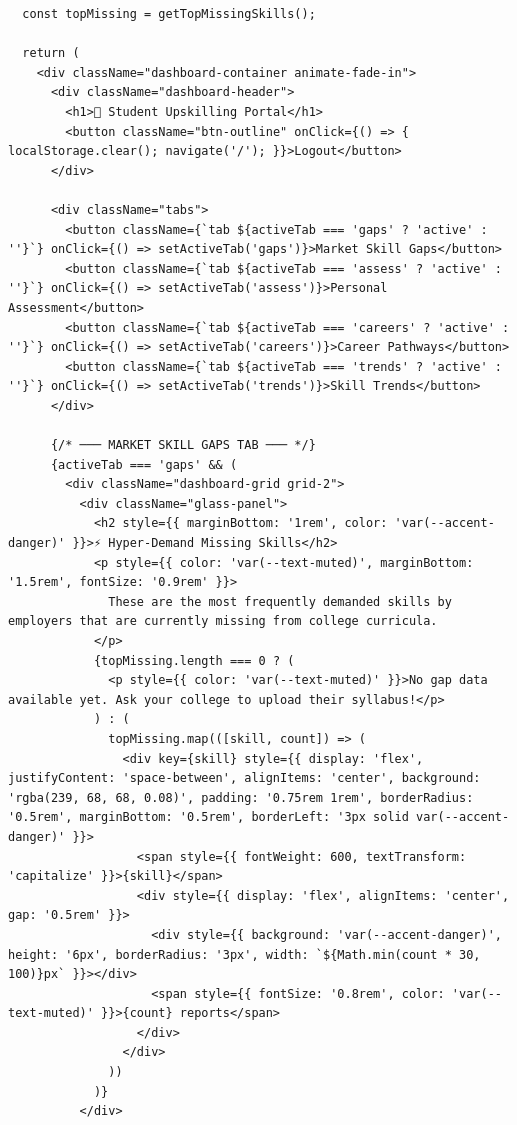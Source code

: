 \documentclass[12pt,a4paper]{report}
\begin{document}
\begin{verbatim}
  const topMissing = getTopMissingSkills();

  return (
    <div className="dashboard-container animate-fade-in">
      <div className="dashboard-header">
        <h1>🔮 Student Upskilling Portal</h1>
        <button className="btn-outline" onClick={() => { localStorage.clear(); navigate('/'); }}>Logout</button>
      </div>

      <div className="tabs">
        <button className={`tab ${activeTab === 'gaps' ? 'active' : ''}`} onClick={() => setActiveTab('gaps')}>Market Skill Gaps</button>
        <button className={`tab ${activeTab === 'assess' ? 'active' : ''}`} onClick={() => setActiveTab('assess')}>Personal Assessment</button>
        <button className={`tab ${activeTab === 'careers' ? 'active' : ''}`} onClick={() => setActiveTab('careers')}>Career Pathways</button>
        <button className={`tab ${activeTab === 'trends' ? 'active' : ''}`} onClick={() => setActiveTab('trends')}>Skill Trends</button>
      </div>

      {/* ─── MARKET SKILL GAPS TAB ─── */}
      {activeTab === 'gaps' && (
        <div className="dashboard-grid grid-2">
          <div className="glass-panel">
            <h2 style={{ marginBottom: '1rem', color: 'var(--accent-danger)' }}>⚡ Hyper-Demand Missing Skills</h2>
            <p style={{ color: 'var(--text-muted)', marginBottom: '1.5rem', fontSize: '0.9rem' }}>
              These are the most frequently demanded skills by employers that are currently missing from college curricula.
            </p>
            {topMissing.length === 0 ? (
              <p style={{ color: 'var(--text-muted)' }}>No gap data available yet. Ask your college to upload their syllabus!</p>
            ) : (
              topMissing.map(([skill, count]) => (
                <div key={skill} style={{ display: 'flex', justifyContent: 'space-between', alignItems: 'center', background: 'rgba(239, 68, 68, 0.08)', padding: '0.75rem 1rem', borderRadius: '0.5rem', marginBottom: '0.5rem', borderLeft: '3px solid var(--accent-danger)' }}>
                  <span style={{ fontWeight: 600, textTransform: 'capitalize' }}>{skill}</span>
                  <div style={{ display: 'flex', alignItems: 'center', gap: '0.5rem' }}>
                    <div style={{ background: 'var(--accent-danger)', height: '6px', borderRadius: '3px', width: `${Math.min(count * 30, 100)}px` }}></div>
                    <span style={{ fontSize: '0.8rem', color: 'var(--text-muted)' }}>{count} reports</span>
                  </div>
                </div>
              ))
            )}
          </div>


\end{verbatim}
\end{document}

